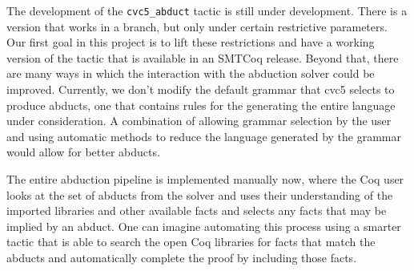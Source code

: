 \documentclass[conference]{IEEEtran}
\begin{document}
  The development of the \texttt{cvc5\_abduct} tactic
  is still under development. There is a version that
  works in a branch, but only under certain restrictive
  parameters. Our first goal in this project is to 
  lift these restrictions and have a working version 
  of the tactic that is available in an SMTCoq release.
  Beyond that, there are many ways in which the 
  interaction with the abduction solver could be 
  improved. Currently, 
  we don't modify the default grammar that
  cvc5 selects to produce abducts, one that 
  contains rules for the generating the 
  entire language
  under consideration. A combination of allowing 
  grammar selection by the user and using automatic
  methods to reduce the language generated by the 
  grammar would allow for better abducts.
  
  The entire abduction pipeline is implemented 
  manually now, where the Coq user looks at the set 
  of abducts from the solver and 
  uses their understanding of the imported libraries
  and other available facts and selects any
  facts that may be implied by an abduct. One 
  can imagine automating this process using 
  a smarter tactic that is able to search 
  the open Coq libraries for facts that 
  match the abducts and automatically complete 
  the proof by including those facts.



\end{document}
